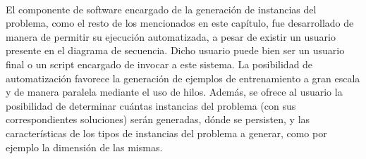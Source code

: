 \paragraph{} El componente de software encargado de la generación de instancias del problema, como el resto de los mencionados en este capítulo, fue desarrollado de manera de permitir su ejecución automatizada, a pesar de existir un usuario presente en el diagrama de secuencia.
Dicho usuario puede bien ser un usuario final o un script encargado de invocar a este sistema.
La posibilidad de automatización favorece la generación de ejemplos de entrenamiento a gran escala y de manera paralela mediante el uso de hilos.
Además, se ofrece al usuario la posibilidad de determinar cuántas instancias del problema (con sus correspondientes soluciones) serán generadas, dónde se persisten, y las características de los tipos de instancias del problema a generar, como por ejemplo la dimensión de las mismas.